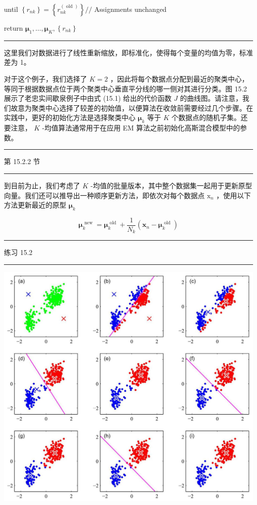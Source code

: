 \documentclass[10pt]{report}
\newcommand{\HRule}{\begin{center}\rule{0.9\linewidth}{0.2mm}\end{center}}
\begin{document}
until \(\left\{  {r}_{nk}\right\}   = \left\{  {r}_{nk}^{\left( \text{ old }\right) }\right\}  //\) Assignments unchanged

return \({\mathbf{\mu }}_{1},\ldots ,{\mathbf{\mu }}_{K},\left\{  {r}_{nk}\right\}\)

\HRule

这里我们对数据进行了线性重新缩放，即标准化，使得每个变量的均值为零，标准差为 1。

对于这个例子，我们选择了 \(K = 2\) ，因此将每个数据点分配到最近的聚类中心，等同于根据数据点位于两个聚类中心垂直平分线的哪一侧对其进行分类。图 15.2 展示了老忠实间歇泉例子中由式 (15.1) 给出的代价函数 \(J\) 的曲线图。请注意，我们故意为聚类中心选择了较差的初始值，以便算法在收敛前需要经过几个步骤。在实践中，更好的初始化方法是选择聚类中心 \({\mathbf{\mu }}_{k}\) 等于 \(K\) 个数据点的随机子集。还要注意， \(K\) -均值算法通常用于在应用 EM 算法之前初始化高斯混合模型中的参数。

\HRule

第 15.2.2 节

\HRule

到目前为止，我们考虑了 \(K\) -均值的批量版本，其中整个数据集一起用于更新原型向量。我们还可以推导出一种顺序更新方法，即依次对每个数据点 \({\mathrm{x}}_{n}\) ，使用以下方法更新最近的原型 \({\mathbf{\mu }}_{k}\)

\[
{\mathbf{\mu }}_{k}^{\text{ new }} = {\mathbf{\mu }}_{k}^{\text{ old }} + \frac{1}{{N}_{k}}\left( {{\mathbf{x}}_{n} - {\mathbf{\mu }}_{k}^{\text{ old }}}\right)  \tag{15.5}
\]

\HRule

练习 15.2

\HRule

\begin{center}
\includegraphics[max width=1.0\textwidth]{images/0194e279-9b28-703a-88f4-c3ac21e2010d_482_248_436_1304_1202_0.jpg}
\end{center}
\hspace*{3em} 
\end{document}
